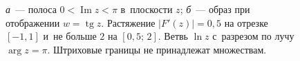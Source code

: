 \begin{figure}[h]
  \centering
  \ifdim\linewidth<469.75pt\resizebox{\linewidth}{!}{\rule{469.75pt}{120pt}}\else\rule{469.75pt}{120pt}\fi
  \caption{\textit{а}~--- полоса $0<\operatorname{Im} z<\pi$ в~плоскости $z$; \textit{б}~--- образ при отображении $w=\operatorname{tg} z$. Растяжение $|F'(z)|=0{,}5$ на отрезке $[-1,1]$ и~не больше $2$ на $[0{,}5;\,2]$. Ветвь $\ln z$ с~разрезом по лучу $\arg z=\pi$. Штриховые границы не принадлежат множествам.}
\end{figure}

